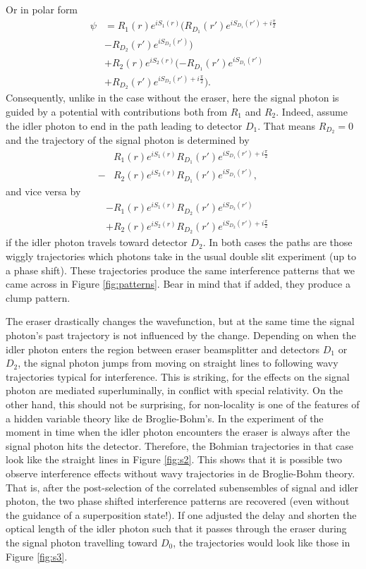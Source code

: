 \documentclass[11pt]{article}
\numberwithin{equation}{section}
\begin{document}
\noindent Or in polar form
\begin{align}
\label{bohmeraser}
\psi&= R_1(r)e^{iS_1(r)}(R_{D_1}(r')e^{iS_{D_1}(r')+i\frac{\pi}{2}}\\
&-R_{D_2}(r')e^{iS_{D_2}(r')})\nonumber \\
&+ R_2(r)e^{iS_2(r)}(-R_{D_1}(r')e^{iS_{D_1}(r')}\nonumber\\
&+R_{D_2}(r')e^{iS_{D_2}(r')+i\frac{\pi}{2}})\nonumber.
\end{align} Consequently, unlike in the case without the eraser, here the signal photon is guided by a potential with contributions both from $R_1$ and $R_2$. Indeed, assume the idler photon to end in the path leading to detector $D_1$. That means $R_{D_2}=0$ and the trajectory of the signal photon is determined by
\begin{align}
& R_1(r)e^{iS_1(r)}R_{D_1}(r')e^{iS_{D_1}(r')+i\frac{\pi}{2}} \nonumber \\
-& R_2(r)e^{iS_2(r)}R_{D_1}(r')e^{iS_{D_1}(r')},
\end{align} and vice versa by
\begin{align}
&- R_1(r)e^{iS_1(r)}R_{D_2}(r')e^{iS_{D_2}(r')} \nonumber
\\ &+R_2(r)e^{iS_2(r)}R_{D_2}(r')e^{iS_{D_2}(r')+i\frac{\pi}{2}}
\end{align} if the idler photon travels toward detector $D_2$. In both cases the paths are those wiggly trajectories  which photons take in the usual double slit experiment (up to a phase shift). These trajectories produce the same interference patterns that we came across in Figure \ref{fig:patterns}. Bear in mind that if added, they produce a clump pattern.    

The eraser drastically changes the wavefunction, but at the same time the signal photon's past trajectory is not influenced by the change. Depending on when the idler photon enters the region between eraser beamsplitter and detectors $D_1$ or $D_2$, the signal photon jumps from moving on straight lines to following wavy trajectories typical for interference. This is striking, for the effects on the signal photon are mediated superluminally, in conflict with special relativity. On the other hand, this should not be surprising, for non-locality is one of the features of a hidden variable theory like de Broglie-Bohm's. In the experiment of \cite{Kim1999} the moment in time when the idler photon encounters the eraser is always after the signal photon hits the detector. Therefore, the Bohmian trajectories in that case look like the straight lines in Figure \ref{fig:s2}. This shows that it is possible two observe interference effects without wavy trajectories in de Broglie-Bohm theory. That is, after the post-selection of the correlated subensembles of signal and idler photon, the two phase shifted interference patterns are recovered (even without the guidance of a superposition state!). If one adjusted the delay and shorten the optical length of the idler photon such that it passes through the eraser during the signal photon travelling toward $D_0$, the trajectories would look like those in Figure \ref{fig:s3}.
\end{document}
